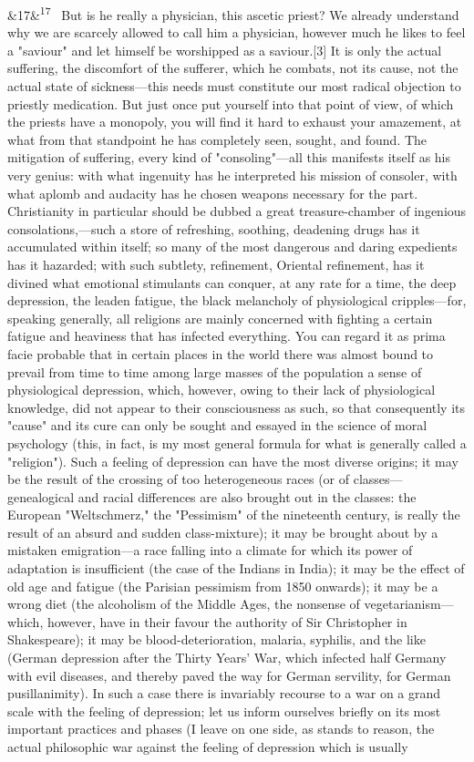 \documentclass[12pt]{article}
\newcommand{\para}[1][]{\par\noindent\ifx&#1&\else\textsuperscript{\footnotesize #1}~\fi}
\begin{document}
\para[17] But is he really a physician, this ascetic priest? We already understand why we are scarcely allowed to call him a physician, however much he likes to feel a "saviour" and let himself be worshipped as a saviour.[3] It is only the actual suffering, the discomfort of the sufferer, which he combats, not its cause, not the actual state of sickness---this needs must constitute our most radical objection to priestly medication. But just once put yourself into that point of view, of which the priests have a monopoly, you will find it hard to exhaust your amazement, at what from that standpoint he has completely seen, sought, and found. The mitigation of suffering, every kind of "consoling"---all this manifests itself as his very genius: with what ingenuity has he interpreted his mission of consoler, with what aplomb and audacity has he chosen weapons necessary for the part. Christianity in particular should be dubbed a great treasure-chamber of ingenious consolations,---such a store of refreshing, soothing, deadening drugs has it accumulated within itself; so many of the most dangerous and daring expedients has it hazarded; with such subtlety, refinement, Oriental refinement, has it divined what emotional stimulants can conquer, at any rate for a time, the deep depression, the leaden fatigue, the black melancholy of physiological cripples---for, speaking generally, all religions are mainly concerned with fighting a certain fatigue and heaviness that has infected everything. You can regard it as prima facie probable that in certain places in the world there was almost bound to prevail from time to time among large masses of the population a sense of physiological depression, which, however, owing to their lack of physiological knowledge, did not appear to their consciousness as such, so that consequently its "cause" and its cure can only be sought and essayed in the science of moral psychology (this, in fact, is my most general formula for what is generally called a "religion"). Such a feeling of depression can have the most diverse origins; it may be the result of the crossing of too heterogeneous races (or of classes---genealogical and racial differences are also brought out in the classes: the European "Weltschmerz," the "Pessimism" of the nineteenth century, is really the result of an absurd and sudden class-mixture); it may be brought about by a mistaken emigration---a race falling into a climate for which its power of adaptation is insufficient (the case of the Indians in India); it may be the effect of old age and fatigue (the Parisian pessimism from 1850 onwards); it may be a wrong diet (the alcoholism of the Middle Ages, the nonsense of vegetarianism---which, however, have in their favour the authority of Sir Christopher in Shakespeare); it may be blood-deterioration, malaria, syphilis, and the like (German depression after the Thirty Years' War, which infected half Germany with evil diseases, and thereby paved the way for German servility, for German pusillanimity). In such a case there is invariably recourse to a war on a grand scale with the feeling of depression; let us inform ourselves briefly on its most important practices and phases (I leave on one side, as stands to reason, the actual philosophic war against the feeling of depression which is usually 
\end{document}
